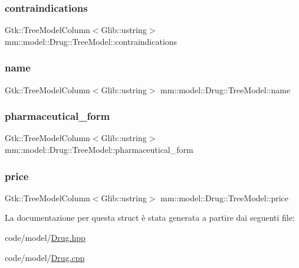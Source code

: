\subsubsection{\texorpdfstring{contraindications}{contraindications}}
{\footnotesize\ttfamily Gtk\+::\+Tree\+Model\+Column$<$Glib\+::ustring$>$ mm\+::model\+::\+Drug\+::\+Tree\+Model\+::contraindications}

\mbox{\label{structmm_1_1model_1_1_drug_1_1_tree_model_a21ecd0c62d35f3a4f2e16253d5faa09c}} 
\subsubsection{\texorpdfstring{name}{name}}
{\footnotesize\ttfamily Gtk\+::\+Tree\+Model\+Column$<$Glib\+::ustring$>$ mm\+::model\+::\+Drug\+::\+Tree\+Model\+::name}

\mbox{\label{structmm_1_1model_1_1_drug_1_1_tree_model_a29443772824bbfc47d5c61e5e5c46050}} 
\subsubsection{\texorpdfstring{pharmaceutical\+\_\+form}{pharmaceutical\_form}}
{\footnotesize\ttfamily Gtk\+::\+Tree\+Model\+Column$<$Glib\+::ustring$>$ mm\+::model\+::\+Drug\+::\+Tree\+Model\+::pharmaceutical\+\_\+form}

\mbox{\label{structmm_1_1model_1_1_drug_1_1_tree_model_a89b06b1ccb81a349452bdb9273867269}} 
\subsubsection{\texorpdfstring{price}{price}}
{\footnotesize\ttfamily Gtk\+::\+Tree\+Model\+Column$<$Glib\+::ustring$>$ mm\+::model\+::\+Drug\+::\+Tree\+Model\+::price}



La documentazione per questa struct è stata generata a partire dai seguenti file\+:\begin{DoxyCompactItemize}
\item 
code/model/\hyperlink{_drug_8hpp}{Drug.\+hpp}\item 
code/model/\hyperlink{_drug_8cpp}{Drug.\+cpp}\end{DoxyCompactItemize}
